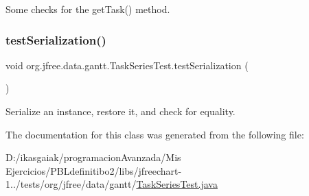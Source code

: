 Some checks for the get\+Task() method. \mbox{\label{classorg_1_1jfree_1_1data_1_1gantt_1_1_task_series_test_a295098d5da9d21b0905b164f8c8086f5}} 
\subsubsection{\texorpdfstring{test\+Serialization()}{testSerialization()}}
{\footnotesize\ttfamily void org.\+jfree.\+data.\+gantt.\+Task\+Series\+Test.\+test\+Serialization (\begin{DoxyParamCaption}{ }\end{DoxyParamCaption})}

Serialize an instance, restore it, and check for equality. 

The documentation for this class was generated from the following file\+:\begin{DoxyCompactItemize}
\item 
D\+:/ikasgaiak/programacion\+Avanzada/\+Mis Ejercicios/\+P\+B\+Ldefinitibo2/libs/jfreechart-\/1../tests/org/jfree/data/gantt/\mbox{\hyperlink{_task_series_test_8java}{Task\+Series\+Test.\+java}}\end{DoxyCompactItemize}
